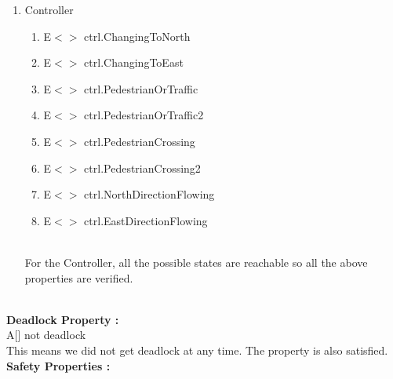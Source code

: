 \documentclass[conference]{IEEEtran}
\begin{document}
\begin{enumerate}
    \item Controller
    \begin{enumerate}
        \item E$<>$ ctrl.ChangingToNorth
        \item E$<>$ ctrl.ChangingToEast
        \item E$<>$ ctrl.PedestrianOrTraffic
        \item E$<>$ ctrl.PedestrianOrTraffic2
        \item E$<>$ ctrl.PedestrianCrossing
        \item E$<>$ ctrl.PedestrianCrossing2
        \item E$<>$ ctrl.NorthDirectionFlowing
        \item E$<>$ ctrl.EastDirectionFlowing

    \end{enumerate}
    \\
    For the Controller, all the possible states are reachable so all the above properties are verified.
    
    
    
\end{enumerate}
\ \\
\noindent\textbf{Deadlock Property :}
\\
\indent A[] not deadlock
\\
\indent This means we did not get deadlock at any time. The property is also satisfied.
\\

\noindent\textbf{Safety Properties :}
\\
\end{document}
